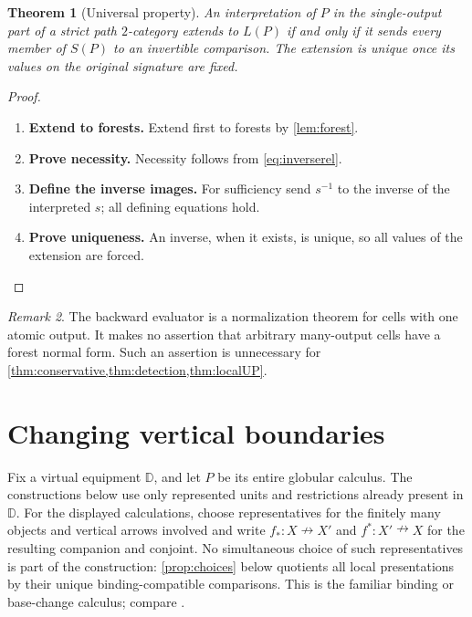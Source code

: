 \documentclass[11pt,reqno]{amsart}
\theoremstyle{plain}
\newtheorem{theorem}{Theorem}[section]
\theoremstyle{definition}
\theoremstyle{remark}
\newtheorem{remark}[theorem]{Remark}
\numberwithin{equation}{section}
\newcommand{\D}{\mathbb D}
\newcommand{\harr}{\mathrel{\nrightarrow}}
\begin{document}
\begin{theorem}[Universal property]\label{thm:localUP}
An interpretation of $P$ in the single-output part of a strict path
$2$-category extends to $L(P)$ if and only if it sends every member of
$S(P)$ to an invertible comparison. The extension is unique once its
values on the original signature are fixed.
\end{theorem}
\begin{proof}\leavevmode
\begin{enumerate}
\item \textbf{Extend to forests.} Extend first to forests by \cref{lem:forest}.

\item \textbf{Prove necessity.} Necessity follows from
\cref{eq:inverserel}.

\item \textbf{Define the inverse images.} For sufficiency send $s^{-1}$ to the inverse of
the interpreted $s$; all defining equations hold.

\item \textbf{Prove uniqueness.} An inverse, when it
exists, is unique, so all values of the extension are forced.\qedhere
\end{enumerate}
\end{proof}

\begin{remark}
The backward evaluator is a normalization theorem for cells with one
atomic output. It makes no assertion that arbitrary many-output cells
have a forest normal form. Such an assertion is unnecessary for
\cref{thm:conservative,thm:detection,thm:localUP}.
\end{remark}

\section{Changing vertical boundaries}\label{sec:global}

Fix a virtual equipment $\D$, and let $P$ be its entire globular calculus.
The constructions below use only represented units and restrictions already
present in $\D$. For the displayed calculations, choose representatives for
the finitely many objects and vertical arrows involved and write
$f_*:X\harr X'$ and $f^*:X'\harr X$ for the resulting companion and
conjoint. No simultaneous choice of such representatives is part of the
construction: \cref{prop:choices} below quotients all local presentations by
their unique binding-compatible comparisons. This is the familiar binding or
base-change calculus; compare \cite[Sections 4--5]{Shulman2008}.
\end{document}
